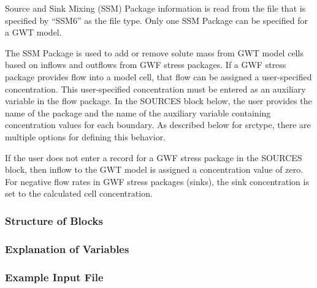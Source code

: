 Source and Sink Mixing (SSM) Package information is read from the file that is specified by ``SSM6'' as the file type.  Only one SSM Package can be specified for a GWT model.  

The SSM Package is used to add or remove solute mass from GWT model cells based on inflows and outflows from GWF stress packages.  If a GWF stress package provides flow into a model cell, that flow can be assigned a user-specified concentration.  This user-specified concentration must be entered as an auxiliary variable in the flow package.  In the SOURCES block below, the user provides the name of the package and the name of the auxiliary variable containing concentration values for each boundary.  As described below for srctype, there are multiple options for defining this behavior.

If the user does not enter a record for a GWF stress package in the SOURCES block, then inflow to the GWT model is assigned a concentration value of zero.  For negative flow rates in GWF stress packages (sinks), the sink concentration is set to the calculated cell concentration.

\vspace{5mm}
\subsubsection{Structure of Blocks}



\vspace{5mm}
\subsubsection{Explanation of Variables}
\begin{description}

\end{description}

\vspace{5mm}
\subsubsection{Example Input File}


